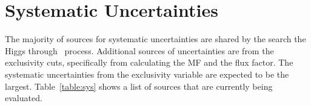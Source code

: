 \clearpage
\section{Systematic Uncertainties}
\label{sec:syst}

\par The majority of sources for systematic uncertainties are shared by the search the 
Higgs through \hwwll\ process. Additional sources of uncertainties are from the exclusivity cuts, 
specifically from calculating the MF and the flux factor. The systematic uncertainties 
from the exclusivity variable are expected to be the largest. Table~\ref{table:sys} shows 
a list of sources that are currently being evaluated. 

\begin{table}
\centering
\caption{Sources of systematic uncertainties that are currently being evaluated. Uncertainties from 
exclusivity variables are expected to be the most dominant.}
\label{table:sys}
\end{table}
